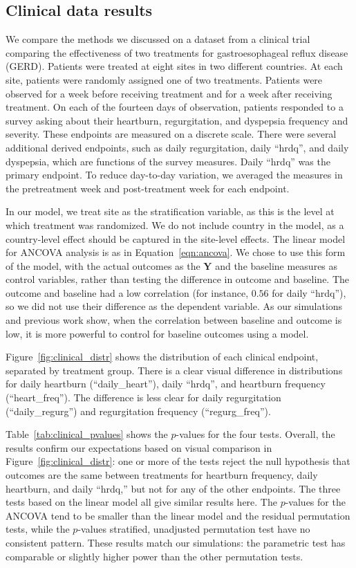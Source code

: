 \documentclass[11pt]{article}
\begin{document}
\subsection*{Clinical data results}
We compare the methods we discussed on a dataset from a clinical trial comparing the effectiveness of two treatments for gastroesophageal reflux disease (GERD).
Patients were treated at eight sites in two different countries.
At each site, patients were randomly assigned one of two treatments.
Patients were observed for a week before receiving treatment and for a week after receiving treatment.
On each of the fourteen days of observation, patients responded to a survey asking about their heartburn, regurgitation, and dyspepsia frequency and severity.
These endpoints are measured on a discrete scale.
There were several additional derived endpoints, such as daily regurgitation, daily ``hrdq'', and daily dyspepsia, which are functions of the survey measures.
Daily ``hrdq'' was the primary endpoint.
To reduce day-to-day variation, we averaged the measures in the pretreatment week and post-treatment week for each endpoint.

In our model, we treat site as the stratification variable, as this is the level at which treatment was randomized.
We do not include country in the model, as a country-level effect should be captured in the site-level effects.
The linear model for ANCOVA analysis is as in Equation~\ref{eqn:ancova}.
We chose to use this form of the model, with the actual outcomes as the $\mathbf{Y}$ and the baseline measures as control variables, rather than testing the difference in outcome and baseline. 
The outcome and baseline had a low correlation (for instance, $0.56$ for daily ``hrdq''), so we did not use their difference as the dependent variable. 
As our simulations and previous work \cite{frison_repeated_1992} show, when the correlation between baseline and outcome is low, it is more powerful to control for baseline outcomes using a model.

Figure~\ref{fig:clinical_distr} shows the distribution of each clinical endpoint, separated by treatment group.
There is a clear visual difference in distributions for daily heartburn (``daily\_heart''), daily ``hrdq'', and heartburn frequency (``heart\_freq'').
The difference is less clear for daily regurgitation (``daily\_regurg'') and regurgitation frequency (``regurg\_freq'').

Table~\ref{tab:clinical_pvalues} shows the $p$-values for the four tests.
Overall, the results confirm our expectations based on visual comparison in Figure~\ref{fig:clinical_distr}:
one or more of the tests reject the null hypothesis that outcomes are the same between treatments for heartburn frequency, daily heartburn, and daily ``hrdq,''
but not for any of the other endpoints.
The three tests based on the linear model all give similar results here.
The $p$-values for the ANCOVA tend to be smaller than the linear model and the residual permutation tests, while the $p$-values stratified, unadjusted permutation test have no consistent pattern.
These results match our simulations: the parametric test has comparable or slightly higher power than the other permutation tests.
\end{document}
